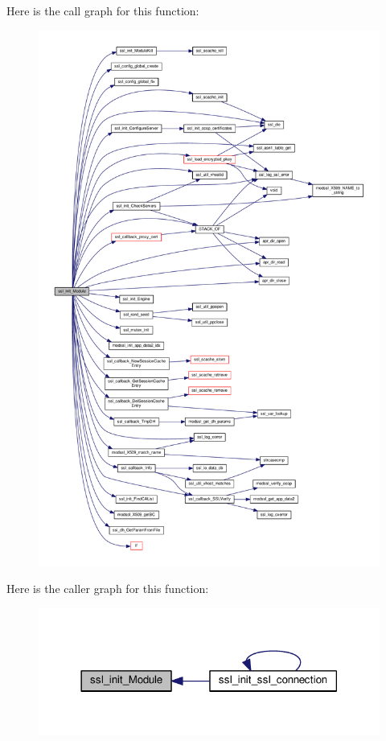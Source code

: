 Here is the call graph for this function\+:
\nopagebreak
\begin{figure}[H]
\begin{center}
\leavevmode
\includegraphics[width=350pt]{group__MOD__SSL__PRIVATE_ga4aa47e22efe0b853cf31c3e8e9a7c70c_cgraph}
\end{center}
\end{figure}




Here is the caller graph for this function\+:
\nopagebreak
\begin{figure}[H]
\begin{center}
\leavevmode
\includegraphics[width=318pt]{group__MOD__SSL__PRIVATE_ga4aa47e22efe0b853cf31c3e8e9a7c70c_icgraph}
\end{center}
\end{figure}


